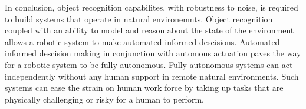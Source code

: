\documentclass {udthesis}
\begin{document}
In conclusion, object recognition capabilites, with robustness to noise, is required to build systems that operate in natural environemnts. Object recognition coupled with an ability to model and reason about the state of the environment allows a robotic system to make automated informed descisions. Automated informed descision making in conjunction with automous actuation paves the way for a robotic system to be fully autonomous. Fully autonomous systems can act independently without any human support in remote natural environments. Such systems can ease the strain on human work force by taking up tasks that are physically challenging or risky for a human to perform.

\printglossary[type=\acronymtype]                  
\end{document}
